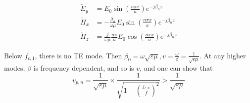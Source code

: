 \documentclass[12pt]{article}
\begin{document}
\begin{align*}
    \tilde E_y &= E_0\sin\left(\frac{n\pi x}{a}\right)e^{-j\beta_nz} \\
    \tilde H_x &= -\frac{\beta_n}{\omega\mu} E_0\sin\left(\frac{n\pi x}{a}\right) e^{-j\beta_nz} \\
    \tilde H_z &= \frac{j}{\omega\mu} \frac{n\pi}{a} E_0\cos\left(\frac{n\pi x}{a}\right)e^{-j\beta_nz}
\end{align*}

Below $f_{c,1}$, there is no TE mode. Then $\beta_0 = \omega\sqrt{\varepsilon\mu}, v = \frac{\omega}{\beta} = \frac{1}{\sqrt{\varepsilon\mu}}$. At any higher modes, $\beta$ is frequency dependent, and so is $v$, and one can show that
$$v_{p,n} = \frac{1}{\sqrt{\varepsilon\mu}} \times \frac{1}{\sqrt{1 - \left(\frac{f_{c,n}}{f}\right)^2}} > \frac{1}{\sqrt{\varepsilon\mu}}$$
\end{document}
